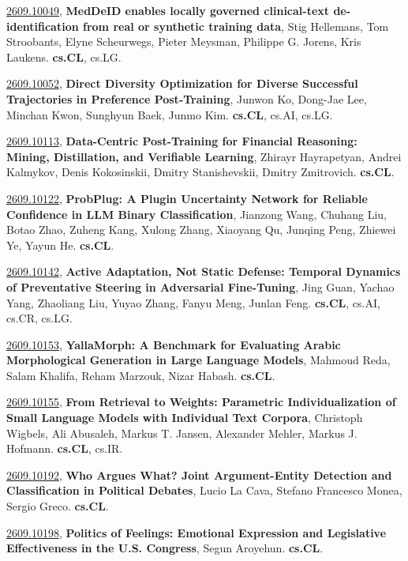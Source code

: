 \documentclass[9pt, a4paper]{article}
\theoremstyle{plain}
\theoremstyle{definition}
\theoremstyle{remark}
\newcommand{\arxivwithtarget}[3]{\hypertarget{#1}{}\href{https://arxiv.org/abs/#1}{#1}, \textbf{\textcolor{arxivblue}{#2}}, #3. }
\begin{document}
\arxivwithtarget{2609.10049}{MedDeID enables locally governed clinical-text de-identification from real or synthetic training data}{Stig Hellemans, Tom Stroobants, Elyne Scheurwegs, Pieter Meysman, Philippe G. Jorens, Kris Laukens}\textbf{cs.CL}, cs.LG.



\arxivwithtarget{2609.10052}{Direct Diversity Optimization for Diverse Successful Trajectories in Preference Post-Training}{Junwon Ko, Dong-Jae Lee, Minchan Kwon, Sunghyun Baek, Junmo Kim}\textbf{cs.CL}, cs.AI, cs.LG.



\arxivwithtarget{2609.10113}{Data-Centric Post-Training for Financial Reasoning: Mining, Distillation, and Verifiable Learning}{Zhirayr Hayrapetyan, Andrei Kalmykov, Denis Kokosinskii, Dmitry Stanishevskii, Dmitry Zmitrovich}\textbf{cs.CL}.



\arxivwithtarget{2609.10122}{ProbPlug: A Plugin Uncertainty Network for Reliable Confidence in LLM Binary Classification}{Jianzong Wang, Chuhang Liu, Botao Zhao, Zuheng Kang, Xulong Zhang, Xiaoyang Qu, Junqing Peng, Zhiewei Ye, Yayun He}\textbf{cs.CL}.



\arxivwithtarget{2609.10142}{Active Adaptation, Not Static Defense: Temporal Dynamics of Preventative Steering in Adversarial Fine-Tuning}{Jing Guan, Yachao Yang, Zhaoliang Liu, Yuyao Zhang, Fanyu Meng, Junlan Feng}\textbf{cs.CL}, cs.AI, cs.CR, cs.LG.



\arxivwithtarget{2609.10153}{YallaMorph: A Benchmark for Evaluating Arabic Morphological Generation in Large Language Models}{Mahmoud Reda, Salam Khalifa, Reham Marzouk, Nizar Habash}\textbf{cs.CL}.



\arxivwithtarget{2609.10155}{From Retrieval to Weights: Parametric Individualization of Small Language Models with Individual Text Corpora}{Christoph Wigbels, Ali Abusaleh, Markus T. Jansen, Alexander Mehler, Markus J. Hofmann}\textbf{cs.CL}, cs.IR.



\arxivwithtarget{2609.10192}{Who Argues What? Joint Argument-Entity Detection and Classification in Political Debates}{Lucio La Cava, Stefano Francesco Monea, Sergio Greco}\textbf{cs.CL}.



\arxivwithtarget{2609.10198}{Politics of Feelings: Emotional Expression and Legislative Effectiveness in the U.S. Congress}{Segun Aroyehun}\textbf{cs.CL}.
\end{document}
